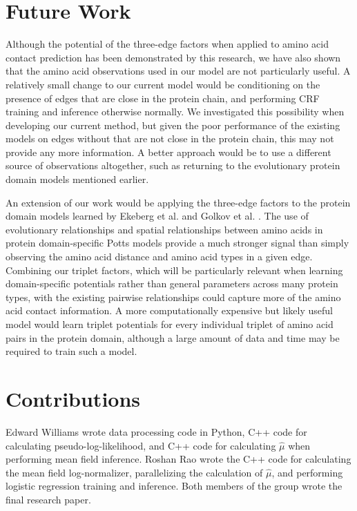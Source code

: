 \documentclass{article}
\begin{document}
\section{Future Work}
Although the potential of the three-edge factors when applied to amino acid contact prediction has been demonstrated by this research, we have also shown that the amino acid observations used in our model are not particularly useful. A relatively small change to our current model would be conditioning on the presence of edges that are close in the protein chain, and performing CRF training and inference otherwise normally. We investigated this possibility when developing our current method, but given the poor performance of the existing models on edges without that are not close in the protein chain, this may not provide any more information. A better approach would be to use a different source of observations altogether, such as returning to the evolutionary protein domain models mentioned earlier.  

An extension of our work would be applying the three-edge factors to the protein domain models learned by Ekeberg et al. and Golkov et al. \cite{ekeberg13} \cite{golkov16}. The use of evolutionary relationships and spatial relationships between amino acids in protein domain-specific Potts models provide a much stronger signal than simply observing the amino acid distance and amino acid types in a given edge. Combining our triplet factors, which will be particularly relevant when learning domain-specific potentials rather than general parameters across many protein types, with the existing pairwise relationships could capture more of the amino acid contact information. A more computationally expensive but likely useful model would learn triplet potentials for every individual triplet of amino acid pairs in the protein domain, although a large amount of data and time may be required to train such a model.  

\section{Contributions}
Edward Williams wrote data processing code in Python, C++ code for calculating pseudo-log-likelihood, and C++ code for calculating $\hat{\mu}$ when performing mean field inference. Roshan Rao wrote the C++ code for calculating the mean field log-normalizer, parallelizing the calculation of $\hat{\mu}$, and performing logistic regression training and inference. Both members of the group wrote the final research paper.  
\end{document}

